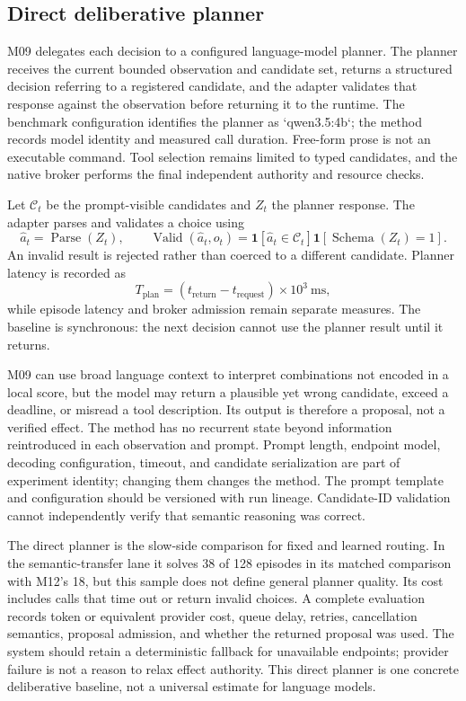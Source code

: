 \subsection{Direct deliberative planner}\label{sec:method-m09}
M09 delegates each decision to a configured language-model planner. The planner receives the current bounded observation and candidate set, returns a structured decision referring to a registered candidate, and the adapter validates that response against the observation before returning it to the runtime. The benchmark configuration identifies the planner as `qwen3.5:4b`; the method records model identity and measured call duration. Free-form prose is not an executable command. Tool selection remains limited to typed candidates, and the native broker performs the final independent authority and resource checks.

Let $\mathcal{C}_t$ be the prompt-visible candidates and $Z_t$ the planner response. The adapter parses and validates a choice using
\begin{equation}
\hat a_t=\operatorname{Parse}(Z_t),\qquad
\operatorname{Valid}(\hat a_t,o_t)=\mathbf{1}[\hat a_t\in\mathcal{C}_t]
\mathbf{1}[\operatorname{Schema}(Z_t)=1].
\end{equation}
An invalid result is rejected rather than coerced to a different candidate. Planner latency is recorded as
\begin{equation}
T_{\mathrm{plan}}=(t_{\mathrm{return}}-t_{\mathrm{request}})\times10^3\ \mathrm{ms},
\end{equation}
while episode latency and broker admission remain separate measures. The baseline is synchronous: the next decision cannot use the planner result until it returns.

M09 can use broad language context to interpret combinations not encoded in a local score, but the model may return a plausible yet wrong candidate, exceed a deadline, or misread a tool description. Its output is therefore a proposal, not a verified effect. The method has no recurrent state beyond information reintroduced in each observation and prompt. Prompt length, endpoint model, decoding configuration, timeout, and candidate serialization are part of experiment identity; changing them changes the method. The prompt template and configuration should be versioned with run lineage. Candidate-ID validation cannot independently verify that semantic reasoning was correct.

The direct planner is the slow-side comparison for fixed and learned routing. In the semantic-transfer lane it solves 38 of 128 episodes in its matched comparison with M12's 18, but this sample does not define general planner quality. Its cost includes calls that time out or return invalid choices. A complete evaluation records token or equivalent provider cost, queue delay, retries, cancellation semantics, proposal admission, and whether the returned proposal was used. The system should retain a deterministic fallback for unavailable endpoints; provider failure is not a reason to relax effect authority. This direct planner is one concrete deliberative baseline, not a universal estimate for language models.



